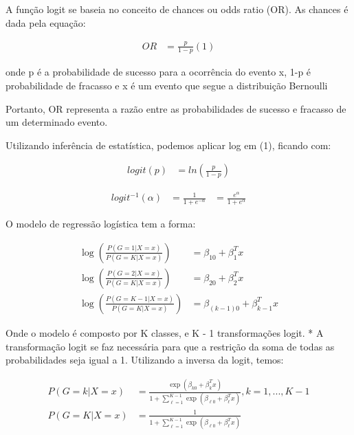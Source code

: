 A função logit se baseia no conceito de chances ou odds ratio (OR). As chances é dada pela equação:

\begin{equation}
  \label{eq:t}
  \begin{aligned}
    OR &= \frac{p}{1-p} (1)
  \end{aligned}
\end{equation}

onde p é a probabilidade de sucesso para a ocorrência do evento x, 1-p é probabilidade de fracasso e x é um evento que segue a distribuição Bernoulli

Portanto, OR representa a razão entre as probabilidades de sucesso e fracasso de um determinado evento. 

Utilizando inferência de estatística, podemos aplicar log em (1), ficando com:

\begin{equation}
  \label{eq:t}
  \begin{aligned}
    logit(p) &= ln\left ( \frac{p}{1-p} \right )
  \end{aligned}
\end{equation}

\begin{equation}
  \label{eq:t}
  \begin{aligned}
    logit^{-1}(\alpha) &= \frac{1}{1+e^{-\alpha}} &= \frac{e^{\alpha}}{1+e^{\alpha}}
  \end{aligned}
\end{equation}

O modelo de regressão logística tem a forma:

\begin{equation}
  \label{eq:t}
  \begin{aligned}
    \log\left ( \frac{P(G = 1 | X = x)}{P(G = K | X = x)} \right ) &= \beta_{10}+\beta_{1}^{T}x\\
    \log\left ( \frac{P(G = 2 | X = x)}{P(G = K | X = x)} \right ) &= \beta_{20}+\beta_{2}^{T}x\\
    \log\left ( \frac{P(G = K-1 | X = x)}{P(G = K | X = x)} \right ) &= \beta_{(k-1)0}+\beta_{k-1}^{T}x
  \end{aligned}
\end{equation}

Onde o modelo \cite{HASTIE} é composto por K classes, e K - 1 transformações logit. * A transformação logit se faz necessária para que a restrição da soma de todas as probabilidades seja igual a 1. Utilizando a inversa da logit, temos:

\begin{equation}
  \label{eq:t}
  \begin{aligned}
    P(G = k | X = x) &= \frac{\exp \left ( \beta_{k0}+\beta_{k}^{T}x \right )}{1 + \sum_{\ell=1}^{K - 1}\exp \left ( \beta_{\ell0}+\beta_{\ell}^{T}x \right )}, k = 1, ..., K - 1\\
    P(G = K | X = x) &= \frac{1}{1 + \sum_{\ell=1}^{K - 1}\exp \left ( \beta_{\ell0}+\beta_{\ell}^{T}x \right )}
  \end{aligned}
\end{equation}

